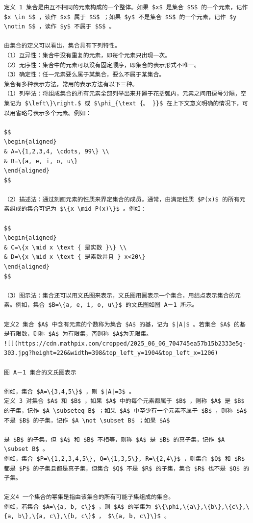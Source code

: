 \documentclass[10pt]{article}
\begin{document}
\begin{verbatim}
定义 1 集合是由互不相同的元素构成的一个整体。如果 $x$ 是集合 $S$ 的一个元素，记作 $x \in S$ ，读作 $x$ 属于 $S$ ；如果 $y$ 不是集合 $S$ 的一个元素，记作 $y \notin S$ ，读作 $y$ 不属于 $S$ 。

由集合的定义可以看出，集合具有下列特性。
（1）互异性：集合中没有重复的元素，即每个元素只出现一次。
（2）无序性：集合中的元素可以没有固定顺序，即集合的表示形式不唯一。
（3）确定性：任一元素要么属于某集合，要么不属于某集合。
集合有多种表示方法，常用的表示方法有以下三种。
（1）列举法：将组成集合的所有元素全部列举出来并置于花括弧内，元素之间用逗号分隔，空集记为 $\left\}\right.$ 或 $\phi_{\text {。 }}$ 在上下文意义明确的情况下，可以用省略号表示多个元素。例如：

$$
\begin{aligned}
& A=\{1,2,3,4, \cdots, 99\} \\
& B=\{a, e, i, o, u\}
\end{aligned}
$$

（2）描述法：通过刻画元素的性质来界定集合的成员。通常，由满足性质 $P(x)$ 的所有元素组成的集合可记为 $\{x \mid P(x)\}$ 。例如：

$$
\begin{aligned}
& C=\{x \mid x \text { 是实数 }\} \\
& D=\{x \mid x \text { 是素数并且 } x<20\}
\end{aligned}
$$

（3）图示法：集合还可以用文氏图来表示，文氏图用圆表示一个集合，用结点表示集合的元素。例如，集合 $B=\{a, e, i, o, u\}$ 的文氏图如图 A－1 所示。

定义2 集合 $A$ 中含有元素的个数称为集合 $A$ 的基，记为 $|A|$ 。若集合 $A$ 的基是有限数，则称 $A$ 为有限集，否则称 $A$为无限集。
![](https://cdn.mathpix.com/cropped/2025_06_06_704745ea57b15b2333e5g-303.jpg?height=226&width=398&top_left_y=1904&top_left_x=1206)

图 A－1 集合的文氏图表示

例如，集合 $A=\{3,4,5\}$ ，则 $|A|=3$ 。
定义 3 对集合 $A$ 和 $B$ ，如果 $A$ 中的每个元素都属于 $B$ ，则称 $A$ 是 $B$ 的子集，记作 $A \subseteq B$ ；如果 $A$ 中至少有一个元素不属于 $B$ ，则称 $A$ 不是 $B$ 的子集，记作 $A \not \subset B$ ；如果 $A$

是 $B$ 的子集，但 $A$ 和 $B$ 不相等，则称 $A$ 是 $B$ 的真子集，记作 $A \subset B$ 。
例如，集合 $P=\{1,2,3,4,5\}, Q=\{1,3,5\}, R=\{2,4\}$ ，则集合 $Q$ 和 $R$ 都是 $P$ 的子集且都是真子集，但集合 $Q$ 不是 $R$ 的子集，集合 $R$ 也不是 $Q$ 的子集。

定义4 一个集合的幂集是指由该集合的所有可能子集组成的集合。
例如，若集合 $A=\{a, b, c\}$ ，则 $A$ 的幂集为 $\{\phi,\{a\},\{b\},\{c\},\{a, b\},\{a, c\},\{b, c\}$ ， $\{a, b, c\}\}$ 。


\end{verbatim}
\end{document}
